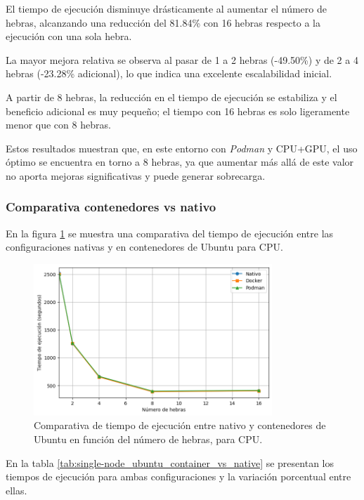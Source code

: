 El tiempo de ejecución disminuye drásticamente al aumentar el número de hebras, alcanzando una reducción del 81.84\% con 16 hebras respecto a la ejecución con una sola hebra.

La mayor mejora relativa se observa al pasar de 1 a 2 hebras (-49.50\%) y de 2 a 4 hebras (-23.28\% adicional), lo que indica una excelente escalabilidad inicial.

A partir de 8 hebras, la reducción en el tiempo de ejecución se estabiliza y el beneficio adicional es muy pequeño; el tiempo con 16 hebras es solo ligeramente menor que con 8 hebras.

Estos resultados muestran que, en este entorno con \textit{Podman} y CPU+GPU, el uso óptimo se encuentra en torno a 8 hebras, ya que aumentar más allá de este valor no aporta mejoras significativas y puede generar sobrecarga.

\subsubsection{Comparativa contenedores vs nativo}

En la figura \ref{fig:single-node_ubuntu_container_vs_native_time} se muestra una comparativa del tiempo de ejecución entre las configuraciones nativas y en contenedores de Ubuntu para CPU.

\begin{figure}[H]
    \centering
    \includegraphics[width=0.8\textwidth]{imagenes/cap5/single-node_ubuntu_container_vs_native_time.png}
    \caption{Comparativa de tiempo de ejecución entre nativo y contenedores de Ubuntu en función del número de hebras, para CPU.}
    \label{fig:single-node_ubuntu_container_vs_native_time}
\end{figure}

En la tabla \ref{tab:single-node_ubuntu_container_vs_native} se presentan los tiempos de ejecución para ambas configuraciones y la variación porcentual entre ellas.

